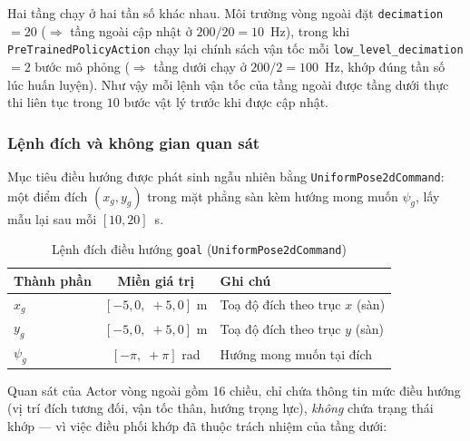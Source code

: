 Hai tầng chạy ở hai tần số khác nhau. Môi trường vòng ngoài đặt
\texttt{decimation}${=}20$ ($\Rightarrow$ tầng ngoài cập nhật ở
$200/20=10$~Hz), trong khi \texttt{PreTrainedPolicyAction} chạy lại chính
sách vận tốc mỗi \texttt{low\_level\_decimation}${=}2$ bước mô phỏng
($\Rightarrow$ tầng dưới chạy ở $200/2=100$~Hz, khớp đúng tần số lúc huấn
luyện). Như vậy mỗi lệnh vận tốc của tầng ngoài được tầng dưới thực thi
liên tục trong $10$ bước vật lý trước khi được cập nhật.

\subsubsection{Lệnh đích và không gian quan sát}

Mục tiêu điều hướng được phát sinh ngẫu nhiên bằng
\texttt{UniformPose2dCommand}: một điểm đích $(x_g, y_g)$ trong mặt phẳng
sàn kèm hướng mong muốn $\psi_g$, lấy mẫu lại sau mỗi $[10,20]$~s.

\begin{table}[H]
    \centering
    \caption{Lệnh đích điều hướng \texttt{goal} (\texttt{UniformPose2dCommand})}
    \label{tab:nav_goal}
    \renewcommand{\arraystretch}{1.3}
    \begin{tabular}{|l|c|l|}
    \hline
    \textbf{Thành phần} & \textbf{Miền giá trị} & \textbf{Ghi chú} \\
    \hline
    $x_g$    & $[-5{,}0,\;+5{,}0]$ m       & Toạ độ đích theo trục $x$ (sàn) \\
    $y_g$    & $[-5{,}0,\;+5{,}0]$ m       & Toạ độ đích theo trục $y$ (sàn) \\
    $\psi_g$ & $[-\pi,\;+\pi]$ rad         & Hướng mong muốn tại đích \\
    \hline
    \end{tabular}
\end{table}

Quan sát của Actor vòng ngoài gồm 16 chiều, chỉ chứa thông tin mức điều
hướng (vị trí đích tương đối, vận tốc thân, hướng trọng lực), \emph{không}
chứa trạng thái khớp — vì việc điều phối khớp đã thuộc trách nhiệm của tầng
dưới:

